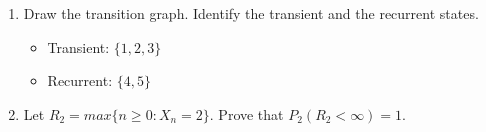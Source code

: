 \documentclass[12pt]{article}
\begin{document}
\begin{enumerate}[label=(\alph*)]
    \item Draw the transition graph. Identify the transient and the recurrent states.\\

        \begin{minipage}[t]{0.4\textwidth}
          \centering{}
        
        
        \end{minipage}\hfill
        \begin{minipage}[t]{0.65\textwidth}
          \vspace{3\baselineskip}
          \begin{itemize}
          
                \item Transient: $\{1,2,3\}$
                \item Recurrent: $\{4,5\}$
          \end{itemize}
        \end{minipage}



    \item Let $R_2 = max\{n \ge 0: X_n =2\}.$ Prove that $P_2(R_2<\infty) = 1.$
    

\end{enumerate}
\end{document}
